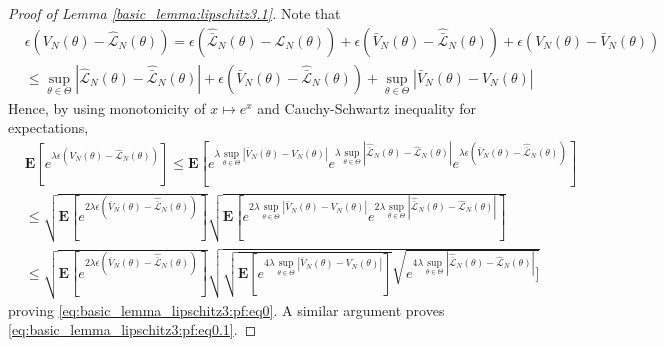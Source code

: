 \documentclass{article}
\newcommand{\bE}{\mathbf{E}}
\begin{document}
\begin{proof}[Proof of Lemma \ref{basic_lemma:lipschitz3.1}]
   Note that
 \[
    \begin{aligned}
     & \epsilon (V_N(\theta)-\hat{\mathcal{L}}_N(\theta)) =
     \epsilon(\hat{\bar{\mathcal{L}}}_N(\theta)-\hat{\mathcal{L}}_N(\theta)) +\epsilon(\bar{V}_N(\theta)-\hat{\bar{\mathcal{L}}}_N(\theta))
     +\epsilon    (V_N(\theta)-\bar{V}_N(\theta)) \\
     & \le \sup_{\theta \in \Theta} |\hat{\mathcal{L}}_N(\theta)-\hat{\bar{\mathcal{L}}}_N(\theta)| 
     +\epsilon (\bar{V}_N(\theta)-\hat{\bar{\mathcal{L}}}_N(\theta))
     +\sup_{\theta \in \Theta} |\bar{V}_N(\theta)-V_N(\theta)| 
    \end{aligned}  
 \]
Hence, by using monotonicity of $x \mapsto e^{x}$ and 
Cauchy-Schwartz inequality for expectations,
    \begin{align*}
        & \bE[e^{\lambda\epsilon (V_N(\theta)-\hat{\mathcal{L}}_N(\theta))}]   
 \le 
      \bE[e^{\lambda \sup_{\theta \in \Theta} |\bar{V}_N(\theta)-V_N(\theta)|} e^{\lambda \sup_{\theta \in \Theta} |\hat{\bar{\mathcal{L}}}_N(\theta)-\hat{\mathcal{L}}_N(\theta)|} e^{\lambda \epsilon(\bar{V}_N(\theta)-\hat{\bar{\mathcal{L}}}_N(\theta))}] 
      \nonumber \\
     & \le \sqrt{\bE[e^{2\lambda\epsilon (\bar{V}_N(\theta)-\hat{\bar{\mathcal{L}}}_N(\theta))}]}
     \sqrt{\bE[e^{2\lambda \sup_{\theta \in \Theta} |\bar{V}_N(\theta)-V_N(\theta)|} e^{2\lambda \sup_{\theta \in \Theta}  |\hat{\bar{\mathcal{L}}}_N(\theta)-\hat{\mathcal{L}}_N(\theta)|}]} \nonumber \\
     & \le \sqrt{\bE[e^{2\lambda\epsilon (\bar{V}_N(\theta)-\hat{\bar{\mathcal{L}}}_N(\theta))}]}
     \sqrt{\sqrt{\bE[e^{4\lambda \sup_{\theta \in \Theta} |\bar{V}_N(\theta)-V_N(\theta)|}]} \sqrt{e^{4\lambda \sup_{\theta \in \Theta} |\hat{\bar{\mathcal{L}}}_N(\theta)-\hat{\mathcal{L}}_N(\theta)|}]}}
    \end{align*}
    proving \eqref{eq:basic_lemma_lipschitz3:pf:eq0}. A similar argument proves \eqref{eq:basic_lemma_lipschitz3:pf:eq0.1}.  
\end{proof}
\end{document}
